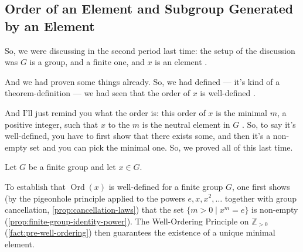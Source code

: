 \subsection{Order of an Element and Subgroup Generated by an Element}

\begin{speech}[00:02:02 - 00:03:18]
So, we were discussing in the second period last time: the setup of the discussion was $G$ is a group, and a finite one, and $x$ is an element .

And we had proven some things already. So, we had defined --- it's kind of a theorem-definition --- we had seen that the order of $x$ is well-defined .

And I'll just remind you what the order is: this order of $x$ is the minimal $m$, a positive integer, such that $x$ to the $m$ is the neutral element in $G$ . So, to say it's well-defined, you have to first show that there exists some, and then it's a non-empty set and you can pick the minimal one. So, we proved all of this last time.
\end{speech}

\begin{content}

Let $G$ be a finite group and let $x \in G$.


\begin{steps}
To establish that $\operatorname{Ord}(x)$ is well-defined for a finite group $G$, one first shows (by the pigeonhole principle applied to the powers $e, x, x^2, \dots$ together with group cancellation, \cref{prop:cancellation-laws}) that the set $\{ m > 0 \mid x^m = e \}$ is non-empty (\cref{prop:finite-group-identity-power}). The Well-Ordering Principle on $\mathbb{Z}_{>0}$ (\cref{fact:pre-well-ordering}) then guarantees the existence of a unique minimal element.
\end{steps}
\end{content}

